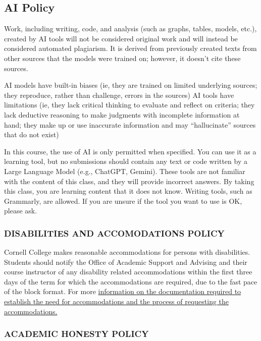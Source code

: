 \documentclass[
  letterpaper,
  DIV=11,
  numbers=noendperiod]{scrartcl}
\begin{document}
\subsection{AI Policy}\label{ai-policy}

Work, including writing, code, and analysis (such as graphs, tables,
models, etc.), created by AI tools will not be considered original work
and will instead be considered automated plagiarism. It is derived from
previously created texts from other sources that the models were trained
on; however, it doesn't cite these sources.

AI models have built-in biases (ie, they are trained on limited
underlying sources; they reproduce, rather than challenge, errors in the
sources) AI tools have limitations (ie, they lack critical thinking to
evaluate and reflect on criteria; they lack deductive reasoning to make
judgments with incomplete information at hand; they make up or use
inaccurate information and may ``hallucinate'' sources that do not
exist)

In this course, the use of AI is only permitted when specified. You can
use it as a learning tool, but no submissions should contain any text or
code written by a Large Language Model (e.g., ChatGPT, Gemini). These
tools are not familiar with the content of this class, and they will
provide incorrect answers. By taking this class, you are learning
content that it does not know. Writing tools, such as Grammarly, are
allowed. If you are unsure if the tool you want to use is OK, please
ask.

\subsubsection{DISABILITIES AND ACCOMODATIONS
POLICY}\label{disabilities-and-accomodations-policy}

Cornell College makes reasonable accommodations for persons with
disabilities. Students should notify the Office of Academic Support and
Advising and their course instructor of any disability related
accommodations within the first three days of the term for which the
accommodations are required, due to the fast pace of the block format.
For more
\href{http://www.cornellcollege.edu/academic-support-and-advising/disabilities/index.shtml}{information
on the documentation required to establish the need for accommodations
and the process of requesting the accommodations.}

\subsubsection{ACADEMIC HONESTY POLICY}\label{academic-honesty-policy}
\end{document}
